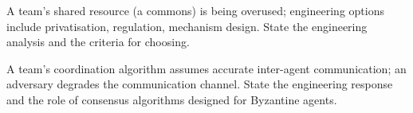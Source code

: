 \begin{exercise}
A team's shared resource (a commons) is being overused; engineering options include privatisation, regulation, mechanism design. State the engineering analysis and the criteria for choosing.
\end{exercise}

\begin{exercise}
A team's coordination algorithm assumes accurate inter-agent communication; an adversary degrades the communication channel. State the engineering response and the role of consensus algorithms designed for Byzantine agents.
\end{exercise}

